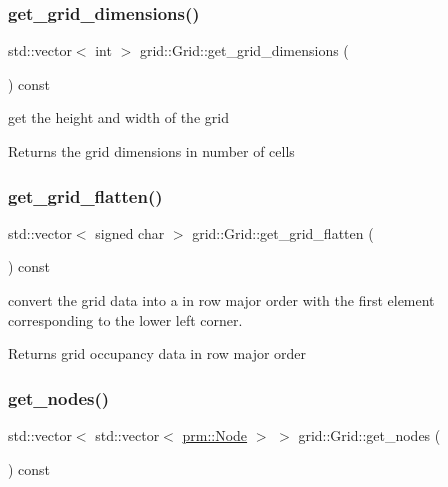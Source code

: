\subsubsection{\texorpdfstring{get\+\_\+grid\+\_\+dimensions()}{get\_grid\_dimensions()}}
{\footnotesize\ttfamily std\+::vector$<$ int $>$ grid\+::\+Grid\+::get\+\_\+grid\+\_\+dimensions (\begin{DoxyParamCaption}{ }\end{DoxyParamCaption}) const}



get the height and width of the grid 

\begin{DoxyReturn}{Returns}
the grid dimensions in number of cells 
\end{DoxyReturn}
\mbox{\label{classgrid_1_1Grid_a7c05ad9408e0ff99e36a3196136f3bb7}} 
\subsubsection{\texorpdfstring{get\+\_\+grid\+\_\+flatten()}{get\_grid\_flatten()}}
{\footnotesize\ttfamily std\+::vector$<$ signed char $>$ grid\+::\+Grid\+::get\+\_\+grid\+\_\+flatten (\begin{DoxyParamCaption}{ }\end{DoxyParamCaption}) const}



convert the grid data into a in row major order with the first element corresponding to the lower left corner. 

\begin{DoxyReturn}{Returns}
grid occupancy data in row major order 
\end{DoxyReturn}
\mbox{\label{classgrid_1_1Grid_a28e01687d0e3e922607e67b3d1d862b6}} 
\subsubsection{\texorpdfstring{get\+\_\+nodes()}{get\_nodes()}}
{\footnotesize\ttfamily std\+::vector$<$ std\+::vector$<$ \hyperlink{structprm_1_1Node}{prm\+::\+Node} $>$ $>$ grid\+::\+Grid\+::get\+\_\+nodes (\begin{DoxyParamCaption}{ }\end{DoxyParamCaption}) const}



